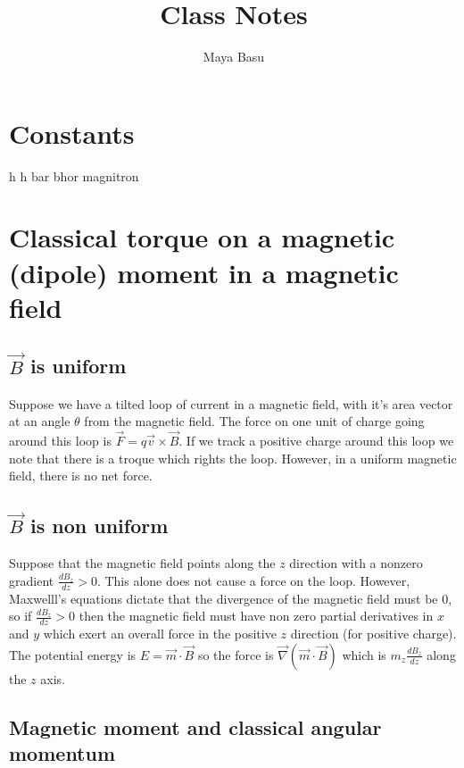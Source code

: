 \documentclass{homework}
\author{Maya Basu}
\title{Class Notes}
\begin{document}
 \maketitle
\section{Constants}

h
h bar
bhor magnitron

\section{}

\section{Classical torque on a magnetic (dipole) moment in a magnetic field}

\subsection{$\vec{B}$ is uniform}

Suppose we have a tilted loop of current in a magnetic field, with it's area vector at an angle $\theta$ from the magnetic field. The force on one unit of charge going around this loop is $\vec{F} = q\vec{v} \times \vec{B}$. If we track a positive charge around this loop we note that there is a troque which rights the loop. However, in a uniform magnetic field, there is no net force. 

\subsection{$\vec{B}$ is non uniform}

Suppose that the magnetic field points along the $z$ direction with a nonzero gradient $\frac{dB_z}{dz}>0$. This alone does not cause a force on the loop. However, Maxwelll's equations dictate that the divergence of the magnetic field must be $0$, so if $\frac{dB_z}{dz}>0$ then the magnetic field must have non zero partial derivatives in $x$ and $y$ which exert an overall force in the positive $z$ direction (for positive charge). The potential energy is $E = \vec{m}\cdot \vec{B}$ so the force is $ \vec{\nabla} (\vec{m} \cdot \vec{B})$ which is $m_z\frac{dB_z}{dz}$ along the $z$ axis.


\subsection{Magnetic moment and classical angular momentum}
\end{document}
